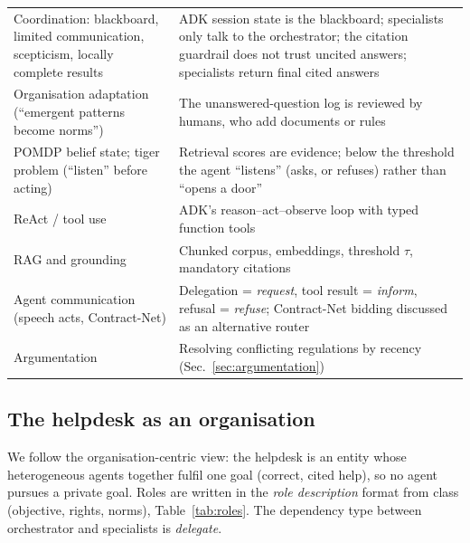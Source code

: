 \documentclass[11pt,a4paper]{article}
\begin{document}
\begin{table}[h]
\begin{tabular}{>{\raggedright\arraybackslash}p{5.2cm}>{\raggedright\arraybackslash}p{10.6cm}}
Coordination: blackboard, limited communication, scepticism, locally complete results & ADK session state is the blackboard; specialists only talk to the orchestrator; the citation guardrail does not trust uncited answers; specialists return final cited answers \\
Organisation adaptation (``emergent patterns become norms'') & The unanswered-question log is reviewed by humans, who add documents or rules \\
POMDP belief state; tiger problem (``listen'' before acting) & Retrieval scores are evidence; below the threshold the agent ``listens'' (asks, or refuses) rather than ``opens a door'' \\
ReAct / tool use & ADK's reason--act--observe loop with typed function tools \\
RAG and grounding & Chunked corpus, embeddings, threshold $\tau$, mandatory citations \\
Agent communication (speech acts, Contract-Net) & Delegation = \emph{request}, tool result = \emph{inform}, refusal = \emph{refuse}; Contract-Net bidding discussed as an alternative router \\
Argumentation & Resolving conflicting regulations by recency (Sec.~\ref{sec:argumentation}) \\
\bottomrule
\end{tabular}
\end{table}

\subsection{The helpdesk as an organisation}
We follow the organisation-centric view: the helpdesk is an entity whose heterogeneous agents together
fulfil one goal (correct, cited help), so no agent pursues a private goal. Roles are written in the
\emph{role description} format from class (objective, rights, norms), Table~\ref{tab:roles}. The
dependency type between orchestrator and specialists is \emph{delegate}.
\end{document}
